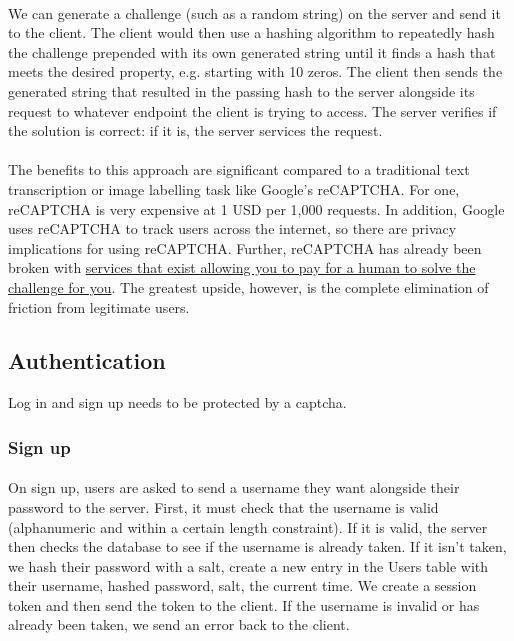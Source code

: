 \documentclass{report}
\begin{document}
\paragraph{}
We can generate a challenge (such as a random string) on the server and send it to the client. The client would then use a hashing algorithm to repeatedly hash the challenge prepended with its own generated string until it finds a hash that meets the desired property, e.g. starting with 10 zeros. The client then sends the generated string that resulted in the passing hash to the server alongside its request to whatever endpoint the client is trying to access. The server verifies if the solution is correct: if it is, the server services the request.

\paragraph{}
The benefits to this approach are significant compared to a traditional text transcription or image labelling task like Google's reCAPTCHA. For one, reCAPTCHA is very expensive at 1 USD per 1,000 requests. In addition, Google uses reCAPTCHA to track users across the internet, so there are privacy implications for using reCAPTCHA. Further, reCAPTCHA has already been broken with \href{https://2captcha.com/}{services that exist allowing you to pay for a human to solve the challenge for you}. The greatest upside, however, is the complete elimination of friction from legitimate users.

\subsection{Authentication}
Log in and sign up needs to be protected by a captcha.

\subsubsection{Sign up}
\paragraph{}
On sign up, users are asked to send a username they want alongside their password to the server. First, it must check that the username is valid (alphanumeric and within a certain length constraint). If it is valid, the server then checks the database to see if the username is already taken. If it isn't taken, we hash their password with a salt, create a new entry in the Users table with their username, hashed password, salt, the current time. We create a session token and then send the token to the client. If the username is invalid or has already been taken, we send an error back to the client.
\end{document}
